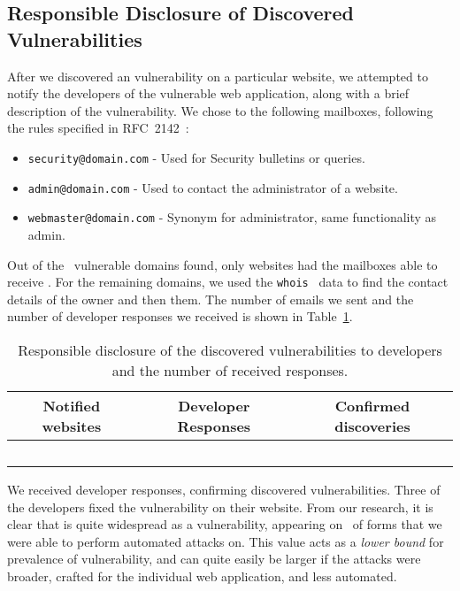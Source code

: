 \subsection{Responsible Disclosure of Discovered Vulnerabilities}
After we discovered an \ehi vulnerability on a particular website, we attempted to notify the developers of the vulnerable web application, along with a brief description of the vulnerability.
We chose to \email the following mailboxes, following the rules specified in RFC~2142~\cite{rfc2142}:
\begin{itemize}
	\item \texttt{security@domain.com} - Used for Security bulletins or queries.
	\item \texttt{admin@domain.com} - Used to contact the administrator of a website.
	\item \texttt{webmaster@domain.com} - Synonym for administrator, same functionality as admin.
\end{itemize}

Out of the \domains\ vulnerable domains found, only \emailedDefaultmailbox websites had the mailboxes able to receive \emails. For the remaining domains, we used the \texttt{whois}~\cite{whois} data to find the contact details of the owner and then \emailed them. The number of emails we sent and the number of developer responses we received is shown in Table~\ref{tab:devresp}.

\begin{table}[tbp]
\centering
\begin{tabular}{|c|c|c|}
	\hline
	\multicolumn{1}{|p{2cm}}{\centering \textbf{Notified websites}} &
	\multicolumn{1}{|p{2cm}|}{\centering \textbf{Developer Responses}} &
	\multicolumn{1}{p{2cm}|}{\centering \textbf{Confirmed discoveries}}\\
	\hline
	\domains\ & \responses & \confirmed \\
	\hline
\end{tabular}
	\caption[\titlecap{}]{Responsible disclosure of the discovered vulnerabilities to developers and the number of received responses.}
	\label{tab:devresp}
\end{table}

We received \responses developer responses, confirming \confirmed discovered vulnerabilities. Three of the developers fixed the vulnerability on their website.
From our research, it is clear that \ehi is quite widespread as a vulnerability, appearing on \successDelta\ of forms that we were able to perform automated attacks on. This value acts as a \emph{lower bound} for prevalence of \ehi vulnerability, and can quite easily be larger if the attacks were broader, crafted for the individual web application, and  less automated. 

